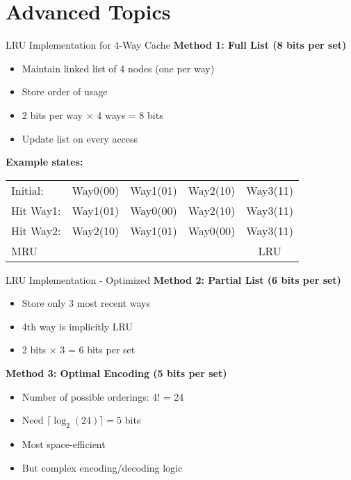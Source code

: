 \documentclass[aspectratio=169,12pt]{beamer}
\begin{document}
\section{Advanced Topics}
\begin{frame}{LRU Implementation for 4-Way Cache}
\textbf{Method 1: Full List (8 bits per set)}
\begin{itemize}
    \item Maintain linked list of 4 nodes (one per way)
    \item Store order of usage
    \item 2 bits per way $\times$ 4 ways = 8 bits
    \item Update list on every access
\end{itemize}

\textbf{Example states:}
\begin{center}
\begin{tabular}{|l|c|c|c|c|}
\hline
Initial: & Way0(00) & Way1(01) & Way2(10) & Way3(11) \\
Hit Way1: & Way1(01) & Way0(00) & Way2(10) & Way3(11) \\
Hit Way2: & Way2(10) & Way1(01) & Way0(00) & Way3(11) \\
\hline
\multicolumn{2}{|l}{MRU} & & & LRU \\
\hline
\end{tabular}
\end{center}
\end{frame}

\begin{frame}{LRU Implementation - Optimized}
\textbf{Method 2: Partial List (6 bits per set)}
\begin{itemize}
    \item Store only 3 most recent ways
    \item 4th way is implicitly LRU
    \item 2 bits × 3 = 6 bits per set
\end{itemize}

\textbf{Method 3: Optimal Encoding (5 bits per set)}
\begin{itemize}
    \item Number of possible orderings: 4! = 24
    \item Need $\lceil \log_2(24) \rceil = 5$ bits
    \item Most space-efficient
    \item But complex encoding/decoding logic
\end{itemize}
\end{frame}
\end{document}
